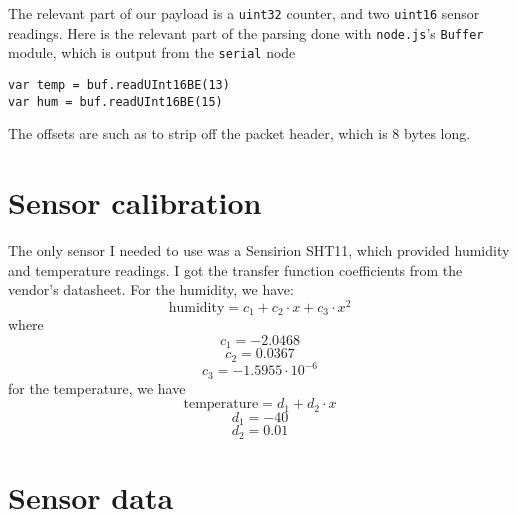 \documentclass[11pt]{article}
\begin{document}
The relevant part of our payload is a \texttt{uint32} counter, and two \texttt{uint16} sensor readings. Here is the relevant part of the parsing done with \texttt{node.js}'s \texttt{Buffer} module, which is output from the \texttt{serial} node

\begin{lstlisting}
var temp = buf.readUInt16BE(13)
var hum = buf.readUInt16BE(15)
\end{lstlisting}

The offsets are such as to strip off the packet header, which is 8 bytes long.

\section{Sensor calibration}
The only sensor I needed to use was a Sensirion SHT11, which provided humidity and temperature readings. I got the transfer function coefficients from the vendor's datasheet. For the humidity, we have:
$$\text{humidity}=c_1+c_2\cdot x +c_3\cdot x^2$$
where
$$c_1= -2.0468$$
$$c_2=  0.0367$$
$$c_3= -1.5955\cdot10^{-6}$$
for the temperature, we have
$$\text{temperature}=d_1+d_2\cdot x$$ 
$$d_1= -40$$
$$d_2=  0.01$$

\section{Sensor data}


\begin{figure}
\end{figure}
\end{document}
